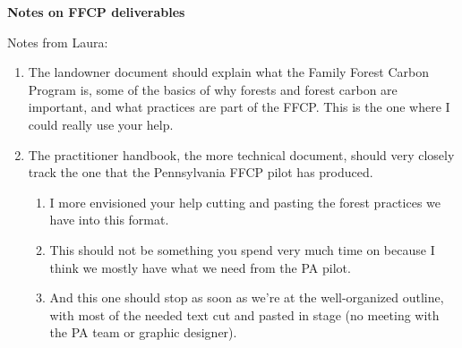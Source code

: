 \documentclass{article}\usepackage[]{graphicx}\usepackage[]{color}
\begin{document}
\noindent \textbf{\Large{Notes on FFCP deliverables}}


Notes from Laura:
\begin{enumerate}
\item The landowner document should explain what the Family Forest Carbon Program is, some of the basics of why forests and forest carbon are important, and what practices are part of the FFCP. This is the one where I could really use your help.
\item The practitioner handbook, the more technical document, should very closely track the one that the Pennsylvania FFCP pilot has produced.
  \begin{enumerate}
  \item I more envisioned your help cutting and pasting the forest practices we have into this format. 
  \item This should not be something you spend very much time on because I think we mostly have what we need from the PA pilot. 
  \item And this one should stop as soon as we're at the well-organized outline, with most of the needed text cut and pasted in stage (no meeting with the PA team or graphic designer).
  \end{enumerate}
\end{enumerate}
\end{document}
